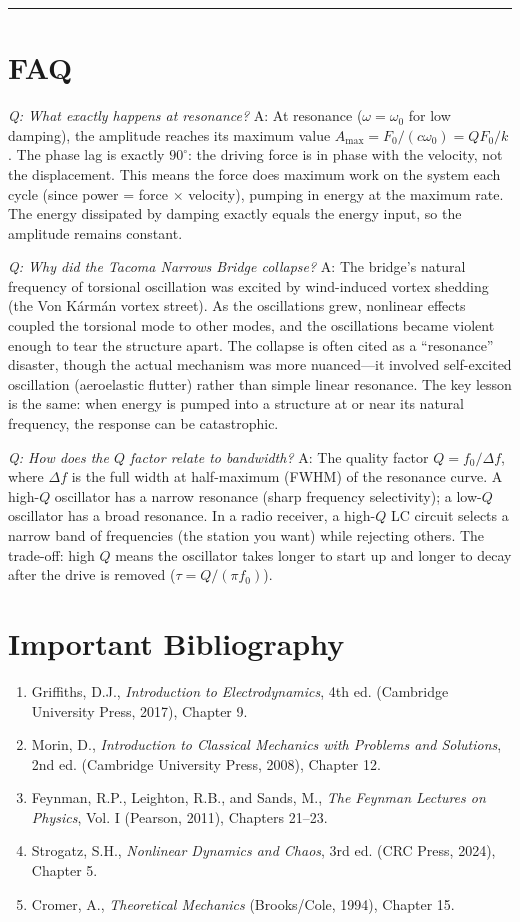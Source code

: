 \bigskip
\hrule
\bigskip
\section*{FAQ}

\textit{Q: What exactly happens at resonance?}
A: At resonance ($\omega = \omega_0$ for low damping), the amplitude reaches its maximum value $A_{\text{max}} = F_0/(c\omega_0) = QF_0/k$. The phase lag is exactly $90^\circ$: the driving force is in phase with the velocity, not the displacement. This means the force does maximum work on the system each cycle (since power = force $\times$ velocity), pumping in energy at the maximum rate. The energy dissipated by damping exactly equals the energy input, so the amplitude remains constant.

\textit{Q: Why did the Tacoma Narrows Bridge collapse?}
A: The bridge's natural frequency of torsional oscillation was excited by wind-induced vortex shedding (the Von K\'{a}rm\'{a}n vortex street). As the oscillations grew, nonlinear effects coupled the torsional mode to other modes, and the oscillations became violent enough to tear the structure apart. The collapse is often cited as a ``resonance'' disaster, though the actual mechanism was more nuanced---it involved self-excited oscillation (aeroelastic flutter) rather than simple linear resonance. The key lesson is the same: when energy is pumped into a structure at or near its natural frequency, the response can be catastrophic.

\textit{Q: How does the $Q$ factor relate to bandwidth?}
A: The quality factor $Q = f_0/\Delta f$, where $\Delta f$ is the full width at half-maximum (FWHM) of the resonance curve. A high-$Q$ oscillator has a narrow resonance (sharp frequency selectivity); a low-$Q$ oscillator has a broad resonance. In a radio receiver, a high-$Q$ LC circuit selects a narrow band of frequencies (the station you want) while rejecting others. The trade-off: high $Q$ means the oscillator takes longer to start up and longer to decay after the drive is removed ($\tau = Q/(\pi f_0)$).
\section*{Important Bibliography}
\begin{enumerate}
\item Griffiths, D.J., \textit{Introduction to Electrodynamics}, 4th ed. (Cambridge University Press, 2017), Chapter 9.
\item Morin, D., \textit{Introduction to Classical Mechanics with Problems and Solutions}, 2nd ed. (Cambridge University Press, 2008), Chapter 12.
\item Feynman, R.P., Leighton, R.B., and Sands, M., \textit{The Feynman Lectures on Physics}, Vol. I (Pearson, 2011), Chapters 21--23.
\item Strogatz, S.H., \textit{Nonlinear Dynamics and Chaos}, 3rd ed. (CRC Press, 2024), Chapter 5.
\item Cromer, A., \textit{Theoretical Mechanics} (Brooks/Cole, 1994), Chapter 15.
\end{enumerate}


